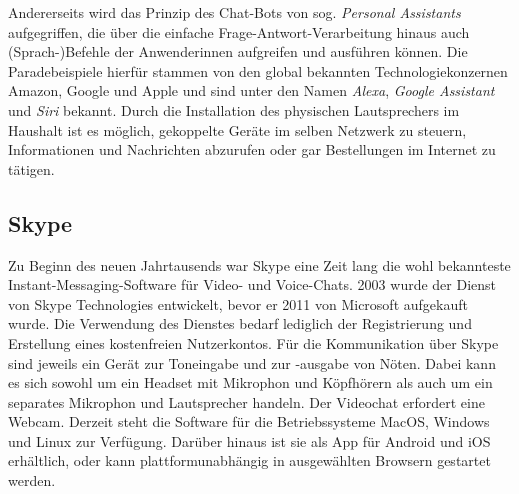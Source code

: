 Andererseits wird das Prinzip des Chat-Bots von sog. \emph{Personal Assistants} aufgegriffen, die über die einfache Frage-Antwort-Verarbeitung hinaus auch (Sprach-)\linebreak[3]Befehle der Anwender{\textperiodcentered}innen aufgreifen und ausführen können. Die Paradebeispiele hierfür stammen von den global bekannten Technologiekonzernen Amazon, Google und Apple und sind unter den Namen \emph{Alexa}, \emph{Google Assistant} und \emph{Siri} bekannt. Durch die Installation des physischen Lautsprechers im Haushalt ist es möglich, gekoppelte Geräte im selben Netzwerk zu steuern, Informationen und Nachrichten abzurufen oder gar Bestellungen im Internet zu tätigen.


\subsection{Skype}\largerpage

\label{K3:subsec:Skype}


Zu Beginn des neuen Jahrtausends war Skype eine Zeit lang die wohl bekannteste Instant-Messaging-Software für Video- und Voice-Chats. 2003 wurde der Dienst von Skype Technologies entwickelt, bevor er 2011 von Microsoft aufgekauft wurde. Die Verwendung des Dienstes bedarf lediglich der Registrierung und Erstellung eines kostenfreien Nutzerkontos. Für die Kommunikation über Skype sind jeweils ein Gerät zur Toneingabe und zur -ausgabe von Nöten. Dabei kann es sich sowohl um ein Headset mit Mikrophon und Köpfhörern als auch um ein separates Mikrophon und Lautsprecher handeln. Der Videochat erfordert eine Webcam. Derzeit steht die Software für die Betriebssysteme MacOS, Windows und Linux zur Verfügung. Darüber hinaus ist sie als App für Android und iOS erhältlich, oder kann plattformunabhängig in ausgewählten Browsern gestartet werden.

